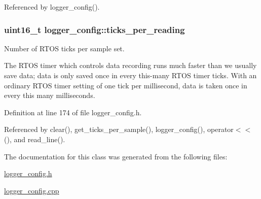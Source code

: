 Referenced by logger\-\_\-config().

\hypertarget{classlogger__config_a24d69cc1f5e9cea4f0d0b3cda10a0fd8}{
\subsubsection[{ticks\-\_\-per\-\_\-reading}]{\setlength{\rightskip}{0pt plus 5cm}uint16\-\_\-t logger\-\_\-config\-::ticks\-\_\-per\-\_\-reading\hspace{0.3cm}{\ttfamily [protected]}}}\label{classlogger__config_a24d69cc1f5e9cea4f0d0b3cda10a0fd8}


Number of R\-T\-O\-S ticks per sample set. 

The R\-T\-O\-S timer which controls data recording runs much faster than we usually save data; data is only saved once in every this-\/many R\-T\-O\-S timer ticks. With an ordinary R\-T\-O\-S timer setting of one tick per millisecond, data is taken once in every this many milliseconds. 

Definition at line 174 of file logger\-\_\-config.\-h.



Referenced by clear(), get\-\_\-ticks\-\_\-per\-\_\-sample(), logger\-\_\-config(), operator$<$$<$(), and read\-\_\-line().



The documentation for this class was generated from the following files\-:\begin{DoxyCompactItemize}
\item 
\hyperlink{logger__config_8h}{logger\-\_\-config.\-h}\item 
\hyperlink{logger__config_8cpp}{logger\-\_\-config.\-cpp}\end{DoxyCompactItemize}
